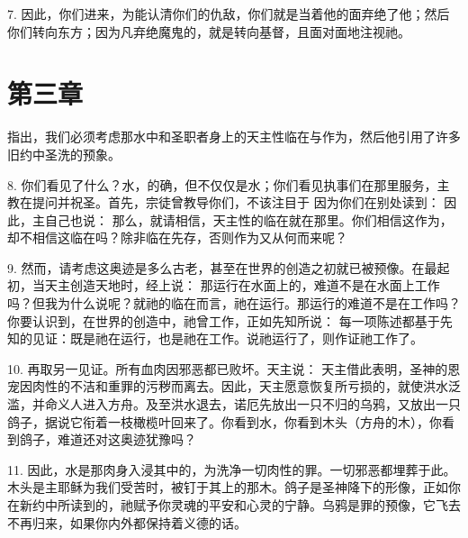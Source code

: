7. 因此，你们进来，为能认清你们的仇敌，你们就是当着他的面弃绝了他；然后你们转向东方；因为凡弃绝魔鬼的，就是转向基督，且面对面地注视祂。\par


\section{第三章}

指出，我们必须考虑那水中和圣职者身上的天主性临在与作为，然后他引用了许多旧约中圣洗的预象。\par

8. 你们看见了什么？水，的确，但不仅仅是水；你们看见执事们在那里服务，主教在提问并祝圣。首先，宗徒曾教导你们，不该注目于  因为你们在别处读到：  因此，主自己也说：  那么，就请相信，天主性的临在就在那里。你们相信这作为，却不相信这临在吗？除非临在先存，否则作为又从何而来呢？\par

9. 然而，请考虑这奥迹是多么古老，甚至在世界的创造之初就已被预像。在最起初，当天主创造天地时，经上说：  那运行在水面上的，难道不是在水面上工作吗？但我为什么说呢？就祂的临在而言，祂在运行。那运行的难道不是在工作吗？你要认识到，在世界的创造中，祂曾工作，正如先知所说： 每一项陈述都基于先知的见证：既是祂在运行，也是祂在工作。说祂运行了，则作证祂工作了。\par

10. 再取另一见证。所有血肉因邪恶都已败坏。天主说：  天主借此表明，圣神的恩宠因肉性的不洁和重罪的污秽而离去。因此，天主愿意恢复所亏损的，就使洪水泛滥，并命义人进入方舟。及至洪水退去，诺厄先放出一只不归的乌鸦，又放出一只鸽子，据说它衔着一枝橄榄叶回来了。你看到水，你看到木头（方舟的木），你看到鸽子，难道还对这奥迹犹豫吗？\par

11. 因此，水是那肉身入浸其中的，为洗净一切肉性的罪。一切邪恶都埋葬于此。木头是主耶稣为我们受苦时，被钉于其上的那木。鸽子是圣神降下的形像，正如你在新约中所读到的，祂赋予你灵魂的平安和心灵的宁静。乌鸦是罪的预像，它飞去不再归来，如果你内外都保持着义德的话。\par

